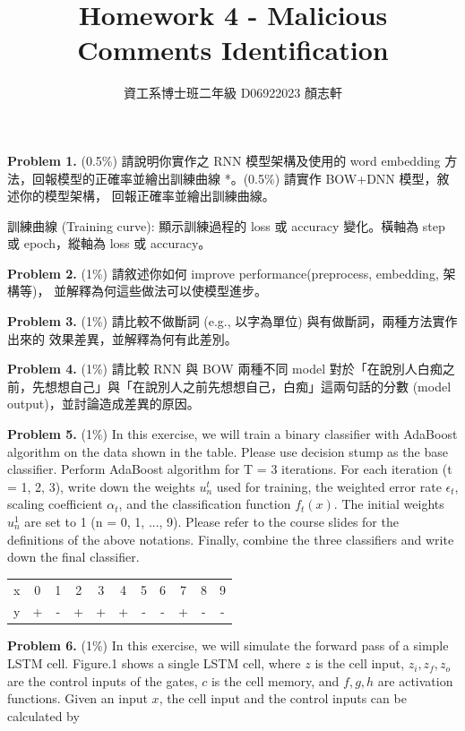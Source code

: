 \documentclass{article}
\title{Homework 4 - Malicious Comments Identification}
\author{資工系博士班二年級 D06922023 顏志軒}
\begin{document}
\maketitle

\textbf{Problem 1.} (0.5\%) 請說明你實作之 RNN 模型架構及使用的 word embedding 方法，回報模型的正確率並繪出訓練曲線 *。(0.5\%) 請實作 BOW+DNN 模型，敘述你的模型架構， 回報正確率並繪出訓練曲線。

\small* 訓練曲線 (Training curve): 顯示訓練過程的 loss 或 accuracy 變化。橫軸為 step 或 epoch，縱軸為 loss 或 accuracy。\normalsize

\textbf{Problem 2.} (1\%) 請敘述你如何 improve performance(preprocess, embedding, 架構等)， 並解釋為何這些做法可以使模型進步。

\textbf{Problem 3.} (1\%) 請比較不做斷詞 (e.g., 以字為單位) 與有做斷詞，兩種方法實作出來的 效果差異，並解釋為何有此差別。

\textbf{Problem 4.} (1\%) 請比較 RNN 與 BOW 兩種不同 model 對於「在說別人白痴之前，先想想自己」與「在說別人之前先想想自己，白痴」這兩句話的分數 (model output)，並討論造成差異的原因。

\textbf{Problem 5.} (1\%) In this exercise, we will train a binary classifier with AdaBoost algorithm on the data shown in the table. Please use decision stump as the base classifier. Perform AdaBoost algorithm for T = 3 iterations. For each iteration (t = 1, 2, 3), write down the weights $u_n^t$ used for training, the weighted error rate $\epsilon_t$, scaling coefficient $\alpha_t$, and the classification function $f_t(x)$. The initial weights $u_n^1$ are set to 1 (n = 0, 1, ..., 9). Please refer to the course slides for the definitions of the above notations. Finally, combine the three classifiers and write down the final classifier.

\begin{center}
\begin{tabular}{c|cccccccccc}
\hline
x & 0 & 1 & 2 & 3 & 4 & 5 & 6 & 7 & 8 & 9\\
y & + & - & + & + & + & - & - & + & - & -\\
\hline
\end{tabular}
\end{center}

\textbf{Problem 6.} (1\%) In this exercise, we will simulate the forward pass of a simple LSTM cell. Figure.1 shows a single LSTM cell, where $z$ is the cell input, $z_i, z_f, z_o$ are the control inputs of the gates, $c$ is the cell memory, and $f, g, h$ are activation functions. Given an input $x$, the cell input and the control inputs can be calculated by
\end{document}
